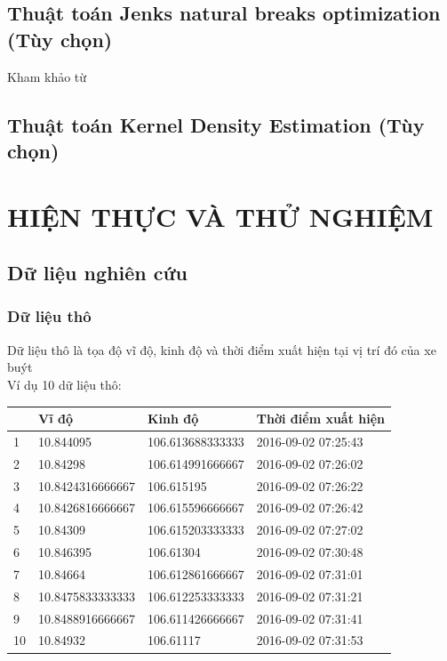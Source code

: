 \documentclass[a4paper, 13pt]{report}
\begin{document}
\section{Thuật toán Jenks natural breaks optimization (Tùy chọn)}
Kham khảo từ \cite{JNBO}
\section{Thuật toán Kernel Density Estimation (Tùy chọn)}
\chapter{HIỆN THỰC VÀ THỬ NGHIỆM}
\section{Dữ liệu nghiên cứu}
\subsection{Dữ liệu thô}
Dữ liệu thô là tọa độ vĩ độ, kinh độ và thời điểm xuất hiện tại vị trí đó của xe buýt\\
Ví dụ 10 dữ liệu thô:\\
\begin{flushleft}
\begin{tabular}{ |l|l|l|l| }
\hline
&Vĩ độ & Kinh độ & Thời điểm xuất hiện \\ 
\hline
1&10.844095 & 106.613688333333 & 2016-09-02 07:25:43 \\ 
\hline
2&10.84298 & 106.614991666667 & 2016-09-02 07:26:02 \\
\hline
3&10.8424316666667 & 106.615195 & 2016-09-02 07:26:22 \\
\hline
4&10.8426816666667 & 106.615596666667 & 2016-09-02 07:26:42 \\
\hline
5&10.84309 & 106.615203333333 & 2016-09-02 07:27:02 \\
\hline
6&10.846395 & 106.61304 & 2016-09-02 07:30:48 \\
\hline
7&10.84664 & 106.612861666667 & 2016-09-02 07:31:01 \\
\hline
8&10.8475833333333 & 106.612253333333 & 2016-09-02 07:31:21 \\
\hline
9&10.8488916666667 & 106.611426666667 & 2016-09-02 07:31:41 \\
\hline
10&10.84932 & 106.61117 & 2016-09-02 07:31:53 \\
\hline 
\end{tabular}
\end{flushleft}
\end{document}
